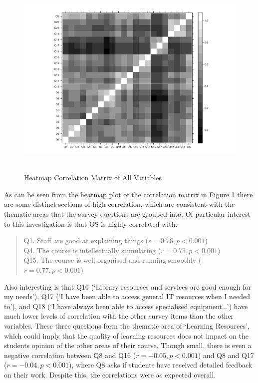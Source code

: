 \documentclass[11pt,a4paper]{report}
\begin{document}
\begin{figure}
		\centering
		\includegraphics[scale=0.5]{images/cormatrix}~\\
		\caption{Heatmap Correlation Matrix of All Variables}\label{fig:HeatmapCorMat}  		
\end{figure}

As can be seen from the heatmap plot of the correlation matrix in Figure \ref{fig:HeatmapCorMat} there are some distinct sections of high correlation, which are consistent with the thematic areas that the survey questions are grouped into. Of particular interest to this investigation is that \ac{OS} is highly correlated with:
\begin{quote}
	Q1. Staff are good at explaining things ($r=0.76, p < 0.001$)\\
	Q4. The course is intellectually stimulating ($r=0.73, p < 0.001$)\\
	Q15. The course is well organised and running smoothly ($r= 0.77, p < 0.001$)\\
\end{quote}

Also interesting is that Q16 (`Library resources and services are good enough for my needs'), Q17 (`I have been able to access general IT resources when I needed to'), and Q18 (`I have always been able to access specialised equipment...') have much lower levels of correlation with the other survey items than the other variables. These three questions form the thematic area of `Learning Resources', which could imply that the quality of learning resources does not impact on the students opinion of the other areas of their course. Though small, there is even a negative correlation between Q8 and Q16 ($r=-0.05, p < 0.001$) and Q8 and Q17 ($r=-0.04, p < 0.001$), where Q8 asks if students have received detailed feedback on their work. Despite this, the correlations were as expected overall. 
\end{document}
